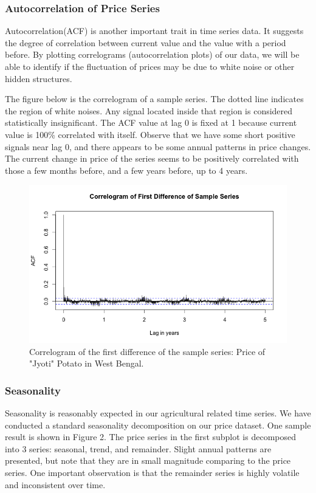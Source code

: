 
\subsubsection*{Autocorrelation of Price Series}
Autocorrelation(ACF) is another important trait in time series data. It suggests the degree of correlation between current value and the value with a period before. By plotting correlograms (autocorrelation plots) of our data, we will be able to identify if the fluctuation of prices may be due to white noise or other hidden structures.

The figure below is the correlogram of a sample series. The dotted line indicates the region of white noises. Any signal located inside that region is considered statistically insignificant. The ACF value at lag 0 is fixed at 1 because current value is 100\% correlated with itself. Observe that we have some short positive signals near lag 0, and there appears to be some annual patterns in price changes. The current change in price of the series seems to be positively correlated with those a few months before, and a few years before, up to 4 years.

\begin{figure}
    \centering
    \includegraphics[width=.7\textwidth]{./img/correlogram.png}
    \caption{Correlogram of the first difference of the sample series: Price of "Jyoti" Potato in West Bengal.}
\end{figure}

\subsubsection*{Seasonality}
Seasonality is reasonably expected in our agricultural related time series. We have conducted a standard seasonality decomposition on our price dataset. One sample result is shown in Figure 2. The price series in the first subplot is decomposed into 3 series: seasonal, trend, and remainder. Slight annual patterns are presented, but note that they are in small magnitude comparing to the price series. One important observation is that the remainder series is highly volatile and inconsistent over time.

